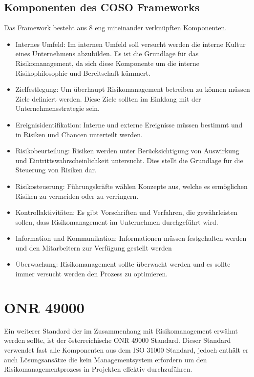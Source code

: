 \documentclass{report}
\begin{document}
\subsection{Komponenten des COSO Frameworks}
Das Framework besteht aus 8 eng miteinander verknüpften Komponenten.


\begin{itemize}
\item Internes Umfeld: Im internen Umfeld soll versucht werden die interne Kultur eines Unternehmens abzubilden. Es ist die Grundlage für das Risikomanagement, da sich diese Komponente um die interne Risikophilosophie und Bereitschaft kümmert.
\item Zielfestlegung: Um überhaupt Risikomanagement betreiben zu können müssen Ziele definiert werden. Diese Ziele sollten im Einklang mit der Unternehmensstrategie sein.
\item Ereignisidentifikation: Interne und externe Ereignisse müssen bestimmt und in Risiken und Chancen unterteilt werden. 
\item Risikobeurteilung: Risiken werden unter Berücksichtigung von Auswirkung und Eintrittswahrscheinlichkeit untersucht. Dies stellt die Grundlage für die Steuerung von Risiken dar.
\item Risikosteuerung: Führungskräfte wählen Konzepte aus, welche es ermöglichen Risiken zu vermeiden oder zu verringern.
\item Kontrollaktivitäten: Es gibt Vorschriften und Verfahren, die gewährleisten sollen, dass Risikomanagement im Unternehmen durchgeführt wird.
\item Information und Kommunikation: Informationen müssen festgehalten werden und den Mitarbeitern zur Verfügung gestellt werden
\item Überwachung: Risikomanagement sollte überwacht werden und es sollte immer versucht werden den Prozess zu optimieren. 
\end{itemize}
\section{ONR 49000}
Ein weiterer Standard der im Zusammenhang mit Risikomanagement erwähnt werden sollte, ist der österreichische ONR 49000 Standard. Dieser Standard verwendet fast alle Komponenten aus dem ISO 31000 Standard, jedoch enthält er auch Lösungsansätze die kein Managementsystem erfordern um den Risikomanagementprozess in Projekten effektiv durchzuführen\cite{COSO}.
\newline
\newline
\end{document}
